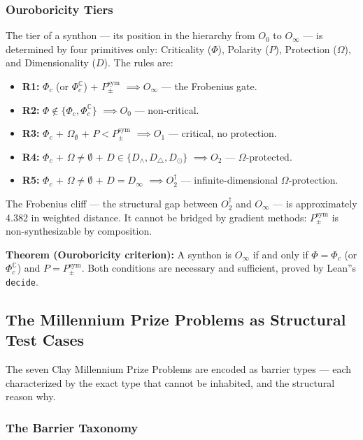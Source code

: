 \documentclass[12pt,a4paper]{article}
\begin{document}
\subsubsection{Ouroboricity Tiers}

The tier of a synthon --- its position in the hierarchy from $O_0$ to $O_{\infty}$ --- is determined by four primitives only: Criticality ($\Phi$), Polarity ($P$), Protection ($\Omega$), and Dimensionality ($D$). The rules are:

\begin{itemize}
    \item \textbf{R1:} $\Phi_c$ (or $\Phi_c^\mathbb{C}$) + $P_{\pm}^{\text{sym}}$ $\implies O_{\infty}$ --- the Frobenius gate.
    \item \textbf{R2:} $\Phi \notin \{\Phi_c, \Phi_c^\mathbb{C}\}$ $\implies O_0$ --- non-critical.
    \item \textbf{R3:} $\Phi_c$ + $\Omega_{\emptyset}$ + $P < P_{\pm}^{\text{sym}}$ $\implies O_1$ --- critical, no protection.
    \item \textbf{R4:} $\Phi_c$ + $\Omega \neq \emptyset$ + $D \in \{D_{\wedge}, D_{\triangle}, D_{\odot}\}$ $\implies O_2$ --- $\Omega$-protected.
    \item \textbf{R5:} $\Phi_c$ + $\Omega \neq \emptyset$ + $D = D_{\infty}$ $\implies O_2^\dagger$ --- infinite-dimensional $\Omega$-protection.
\end{itemize}

The Frobenius cliff --- the structural gap between $O_2^\dagger$ and $O_{\infty}$ --- is approximately 4.382 in weighted distance. It cannot be bridged by gradient methods: $P_{\pm}^{\text{sym}}$ is non-synthesizable by composition.

\textbf{Theorem (Ouroboricity criterion):} A synthon is $O_{\infty}$ if and only if $\Phi = \Phi_c$ (or $\Phi_c^\mathbb{C}$) and $P = P_{\pm}^{\text{sym}}$. Both conditions are necessary and sufficient, proved by Lean''s \texttt{decide}.

\subsection{The Millennium Prize Problems as Structural Test Cases}

The seven Clay Millennium Prize Problems are encoded as barrier types --- each characterized by the exact type that cannot be inhabited, and the structural reason why.

\subsubsection{The Barrier Taxonomy}
\end{document}
